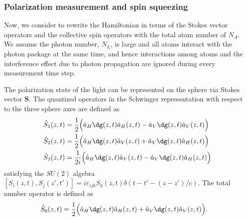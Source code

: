 \subsubsection{Polarization measurement and spin squeezing}

Now, we consider to rewrite the Hamiltonian in terms of the Stokes vector operators and the collective spin operators with the total atom number of $ N_A $. We assume the photon number, $ N_L $, is large and all atoms interact with the photon package at the same time, and hence interactions among atoms and the interference effect due to photon propagation are ignored during every measurement time step. 

The polarization state of the light can be represented on the \Poincare sphere via Stokes vector $ \mathbf{S} $. The quantized operators in the Schwinger representation with respect to the three \Poincare sphere axes are defined as  
\begin{align}
\hat{S}_1(z,t)&= \frac{1}{2} \Big( \hat{a}_H\dg(z,t) \hat{a}_H(z,t) -  \hat{a}_V\dg(z,t) \hat{a}_V(z,t) \Big) \\
\hat{S}_2(z,t)&= \frac{1}{2} \Big( \hat{a}_H\dg(z,t) \hat{a}_V(z,t) +  \hat{a}_V\dg(z,t) \hat{a}_H(z,t) \Big)\\
\hat{S}_3(z,t)&= \frac{1}{2i} \Big( \hat{a}_H\dg(z,t) \hat{a}_V(z,t) -  \hat{a}_V\dg(z,t) \hat{a}_H(z,t) \Big)
\end{align}
satisfying the $ SU(2) $ algebra $ [S_i(z,t),S_j(z',t')]=i\varepsilon_{ijk}S_k(z,t)\delta (t-t' - (z-z')/c ) $. The total number operator is defined as
\begin{align}
\hat{S}_0(z,t)&= \frac{1}{2} \Big( \hat{a}_H\dg(z,t) \hat{a}_H(z,t) +  \hat{a}_V\dg(z,t) \hat{a}_V(z,t) \Big).
\end{align}

